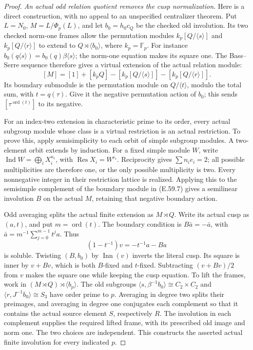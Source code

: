 \begin{proof}
\emph{An actual odd relation quotient removes the cusp normalization.}
Here is a direct construction, with no appeal to an unspecified
centralizer theorem. Put \(L=N_0\), \(M=L/\Phi_p(L)\),
and let \(b_0=h_0c_Q\) be the checked old involution. Its two
checked norm-one frames allow the permutation modules
\(k_p[Q/\langle s\rangle]\) and
\(k_p[Q/\langle r\rangle]\) to extend to
\(Q\rtimes\langle b_0\rangle\), where \(k_p=\mathbb F_p\).
For instance \(b_0(q\langle s\rangle)=b_0(q)\beta\langle s\rangle\);
the norm-one equation makes its square one. The Bass--Serre sequence
therefore gives a virtual extension of the actual relation module:
\[
 [M]=[1]+[k_pQ]-[k_p[Q/\langle s\rangle]]
                    -[k_p[Q/\langle r\rangle]].         \tag{E.59.7}
\]
Its boundary submodule is the permutation module on
\(Q/\langle t\rangle\), modulo the total sum, with
\(t=q(\tau)\). Give it the negative permutation action of
\(b_0\); this sends \([\tau^{\operatorname{ord}(t)}]\)
to its negative.

For an index-two extension in characteristic prime to its order,
every actual subgroup module whose class is a virtual restriction is
an actual restriction. To prove this, apply semisimplicity to each
orbit of simple subgroup modules. A two-element orbit extends by
induction. For a fixed simple module \(W\), write
\(\operatorname{Ind}W=\bigoplus_i X_i^{n_i}\), with
\(\operatorname{Res}X_i=W^{e_i}\). Reciprocity gives
\(\sum n_ie_i=2\); all possible multiplicities are therefore
one, or the only possible multiplicity is two. Every nonnegative
integer in their restriction lattice is realized. Applying this to
the semisimple complement of the boundary module in (E.59.7) gives
a semilinear involution \(B\) on the actual \(M\), retaining
that negative boundary action.

Odd averaging splits the actual finite extension as \(M\rtimes Q\).
Write its actual cusp as \((a,t)\), and put \(m=\operatorname{ord}(t)\).
The boundary condition is
\(B\bar a=-\bar a\), with
\(\bar a=m^{-1}\sum_{j=0}^{m-1}t^ja\). Thus
\[
 (1-t^{-1})v=-t^{-1}a-Ba
\]
is soluble. Twisting \((B,b_0)\) by \(\operatorname{Inn}(v)\)
inverts the literal cusp. Its square is inner by \(v+Bv\),
which is both \(B\)-fixed and \(t\)-fixed. Subtracting
\((v+Bv)/2\) from \(v\) makes the square one while keeping
the cusp equation. To lift the frames, work in
\((M\rtimes Q)\rtimes\langle b_p\rangle\). The old subgroups
\(\langle s,\beta^{-1}b_0\rangle\cong C_2\times C_2\)
and \(\langle r,J^{-1}b_0\rangle\cong S_3\) have order
prime to \(p\). Averaging in degree two splits their preimages,
and averaging in degree one conjugates each complement so that it
contains the actual source element \(S\), respectively \(R\).
The involution in each complement supplies the required lifted
frame, with its prescribed old image and norm one. The two choices
are independent. This constructs the asserted actual finite
involution for every indicated \(p\).


\end{proof}
